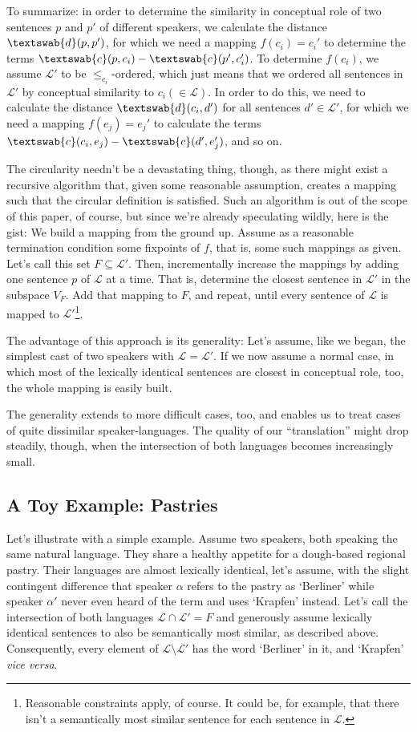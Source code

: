 \documentclass[11pt, a4paper]{scrartcl}
\renewcommand{\i}[1]{\emph{#1}}
\renewcommand{\L}{\mathcal{L}}
\newcommand{\m}[1]{\textswab{#1}}
\begin{document}
To summarize: in order to determine the similarity in conceptual role of two sentences $p$ and $p'$ of different speakers, we calculate the distance $\m{d}(p,p')$, for which we need a mapping $f(c_i) = c_i'$ to determine the terms $\m{c}(p,c_i) - \m{c}(p',c_i')$. To determine $f(c_i)$, we assume $\L'$ to be $\leqslant_{c_i}$-ordered, which just means that we ordered all sentences in $\L'$ by conceptual similarity to $c_i (\in \L)$. In order to do this, we need to calculate the distance $\m{d}(c_i,d')$ for all sentences $d' \in \L'$, for which we need a mapping $f(e_j) = e_j'$ to calculate the terms $\m{c}(c_i,e_j) - \m{c}(d',e_j')$, and so on.

The circularity needn't be a devastating thing, though, as there might exist a recursive algorithm that, given some reasonable assumption, creates a mapping such that the circular definition is satisfied. Such an algorithm is out of the scope of this paper, of course, but since we're already speculating wildly, here is the gist: We build a mapping from the ground up. Assume as a reasonable termination condition some fixpoints of $f$, that is, some such mappings as given. Let's call this set $F \subseteq \L'$. Then, incrementally increase the mappings by adding one sentence $p$ of $\L$ at a time. That is, determine the closest sentence in $\L'$ in the subspace $V_F$. Add that mapping to $F$, and repeat, until every sentence of $\L$ is mapped to $\L'$\footnote{Reasonable constraints apply, of course. It could be, for example, that there isn't a semantically most similar sentence for each sentence in $\L$.}.   

The advantage of this approach is its generality: Let's assume, like we began, the simplest cast of two speakers with $\L = \L'$. If we now assume a normal case, in which most of the lexically identical sentences are closest in conceptual role, too, the whole mapping is easily built. 

The generality extends to more difficult cases, too, and enables us to treat cases of quite dissimilar speaker-languages. The quality of our ``translation'' might drop steadily, though, when the intersection of both languages becomes increasingly small. 

\subsection{A Toy Example: Pastries}

Let's illustrate with a simple example. Assume two speakers, both speaking the same natural language. They share a healthy appetite for a dough-based regional pastry. Their languages are almost lexically identical, let's assume, with the slight contingent difference that speaker $\alpha$ refers to the pastry as `Berliner' while speaker $\alpha'$ never even heard of the term and uses `Krapfen' instead. Let's call the intersection of both languages $\L \cap \L' = F$ and generously assume lexically identical sentences to also be semantically most similar, as described above. Consequently, every element of $\L\setminus \L'$ has the word `Berliner' in it, and `Krapfen' \i{vice versa}.
\end{document}
